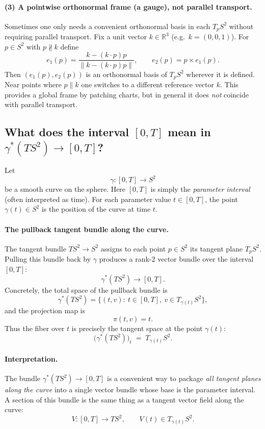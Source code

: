 \documentclass[12pt,a4paper]{article}
\theoremstyle{plain}
\theoremstyle{definition}      %
\begin{document}
	\paragraph{(3) A pointwise orthonormal frame (a gauge), not parallel transport.}
	Sometimes one only needs a convenient orthonormal basis in each $T_pS^2$ without requiring parallel transport.
	Fix a unit vector $k\in\mathbb{R}^3$ (e.g.\ $k=(0,0,1)$). For $p\in S^2$ with $p\not\parallel k$ define
	\[
	e_1(p)=\frac{k-(k\cdot p)p}{\|k-(k\cdot p)p\|},\qquad e_2(p)=p\times e_1(p).
	\]
	Then $(e_1(p),e_2(p))$ is an orthonormal basis of $T_pS^2$ wherever it is defined.
	Near points where $p\parallel k$ one switches to a different reference vector $k$.
	This provides a global frame by patching charts, but in general it does \emph{not} coincide with parallel transport.
	
	
	\subsection*{What does the interval $[0,T]$ mean in $\gamma^*(TS^2)\to[0,T]$?}
	
	Let
	\[
	\gamma:[0,T]\to S^2
	\]
	be a smooth curve on the sphere. Here $[0,T]$ is simply the \emph{parameter interval} (often interpreted as time).
	For each parameter value $t\in[0,T]$, the point $\gamma(t)\in S^2$ is the position of the curve at time $t$.
	
	\paragraph{The pullback tangent bundle along the curve.}
	The tangent bundle $TS^2\to S^2$ assigns to each point $p\in S^2$ its tangent plane $T_pS^2$.
	Pulling this bundle back by $\gamma$ produces a rank-$2$ vector bundle over the interval $[0,T]$:
	\[
	\gamma^*(TS^2)\longrightarrow [0,T].
	\]
	Concretely, the total space of the pullback bundle is
	\[
	\gamma^*(TS^2)=\{(t,v):\ t\in[0,T],\ v\in T_{\gamma(t)}S^2\},
	\]
	and the projection map is
	\[
	\pi(t,v)=t.
	\]
	Thus the fiber over $t$ is precisely the tangent space at the point $\gamma(t)$:
	\[
	\big(\gamma^*(TS^2)\big)_t \;=\; T_{\gamma(t)}S^2.
	\]
	
	\paragraph{Interpretation.}
	The bundle $\gamma^*(TS^2)\to[0,T]$ is a convenient way to package \emph{all tangent planes along the curve}
	into a single vector bundle whose base is the parameter interval.
	A section of this bundle is the same thing as a tangent vector field along the curve:
	\[
	V:[0,T]\to TS^2,\qquad V(t)\in T_{\gamma(t)}S^2.
	\]
	
\end{document}
